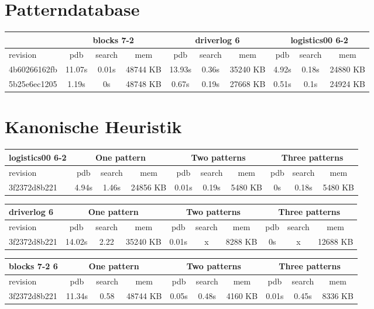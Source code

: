 \documentclass[a4paper,12pt]{scrartcl}
\begin{document}
\section{Patterndatabase}

\begin{tabular}{|l|c|c|c|c|c|c|c|c|c|}\hline
& \multicolumn{3}{c|}{blocks 7-2} & \multicolumn{3}{c|}{driverlog 6} & \multicolumn{3}{c|}{logistics00 6-2}\\\hline
revision & pdb & search & mem & pdb & search & mem & pdb & search & mem\\\hline
4b60266162fb & 11.07s & 0.01s & 48744 KB & 13.93s & 0.36s & 35240 KB & 4.92s & 0.18s & 24880 KB\\\hline
5b25e6ec1205 & 1.19s & 0s & 48748 KB & 0.67s & 0.19s & 27668 KB & 0.51s & 0.1s & 24924 KB\\\hline
\end{tabular}

\section{Kanonische Heuristik}

\begin{tabular}{|l|c|c|c|c|c|c|c|c|c|}\hline
logistics00 6-2 & \multicolumn{3}{c|}{One pattern} & \multicolumn{3}{c|}{Two patterns} & \multicolumn{3}{c|}{Three patterns}\\\hline
revision & pdb & search & mem & pdb & search & mem & pdb & search & mem\\\hline
3f2372d8b221 & 4.94s & 1.46s & 24856 KB & 0.01s & 0.19s & 5480 KB & 0s & 0.18s & 5480 KB\\\hline
\end{tabular}

\begin{tabular}{|l|c|c|c|c|c|c|c|c|c|}\hline
driverlog 6 & \multicolumn{3}{c|}{One pattern} & \multicolumn{3}{c|}{Two patterns} & \multicolumn{3}{c|}{Three patterns}\\\hline
revision & pdb & search & mem & pdb & search & mem & pdb & search & mem\\\hline
3f2372d8b221 & 14.02s & 2.22 & 35240 KB & 0.01s & x & 8288 KB & 0s & x & 12688 KB\\\hline
\end{tabular}

\begin{tabular}{|l|c|c|c|c|c|c|c|c|c|}\hline
blocks 7-2 6 & \multicolumn{3}{c|}{One pattern} & \multicolumn{3}{c|}{Two patterns} & \multicolumn{3}{c|}{Three patterns}\\\hline
revision & pdb & search & mem & pdb & search & mem & pdb & search & mem\\\hline
3f2372d8b221 & 11.34s & 0.58 & 48744 KB & 0.05s & 0.48s & 4160 KB &  0.01s & 0.45s & 8336 KB\\\hline
\end{tabular}
\end{document}
